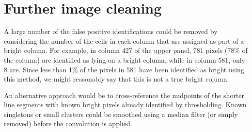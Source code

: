\documentclass[10pt,fleqn]{article}
\begin{document}
\section{Further image cleaning}

A large number of the false positive identifications could be removed by considering the number of the cells in each column that are assigned as part of a bright column. For example, in column 427 of the upper panel, 781 pixels (78\% of the column) are identified as lying on a bright column, while in column 581, only 8 are. Since less than 1\% of the pixels in 581 have been identified as bright using this method, we might reasonably say that this is not a true bright column.

An alternative approach would be to cross-reference the midpoints of the shorter line segments with known bright pixels already identified by thresholding. Known singletons or small clusters could be smoothed using a median filter (or simply removed) before the convolution is applied.


%
%
\end{document}
